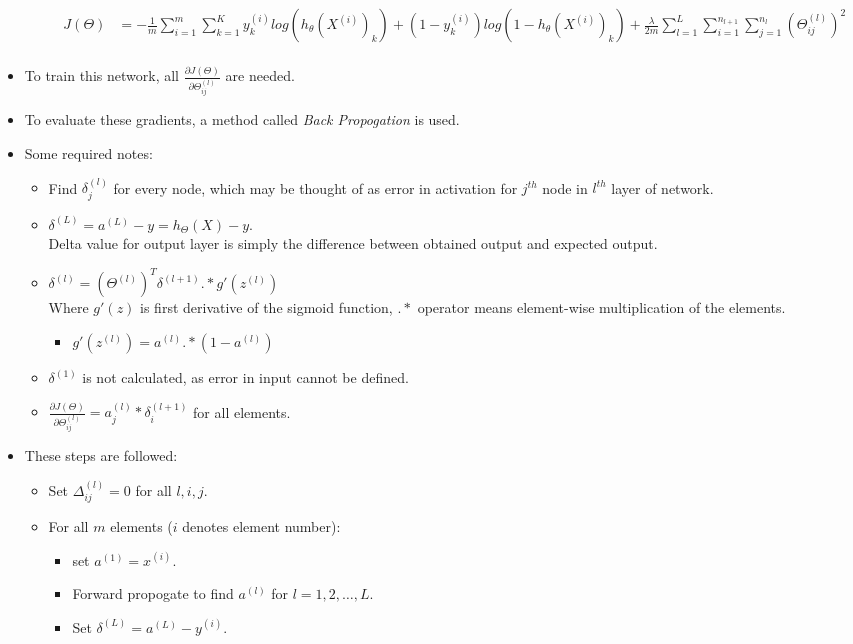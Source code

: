 \documentclass{article}
\begin{document}
\begin{itemize}
\begin{itemize}
		\begin{align*}
			J(\Theta) &= -\frac{1}{m} \sum_{i=1}^m \sum_{k=1}^K y^{(i)}_klog(h_\theta(X^{(i)})_k) + (1-y^{(i)}_k)log(1-h_\theta(X^{(i)})_k) + \frac{\lambda}{2m}\sum_{l=1}^L \sum_{i=1}^{n_{l+1}} \sum_{j=1}^{n_l} (\Theta^{(l)}_{ij})^2\\
		\end{align*}
	\end{itemize}
	\item To train this network, all $\frac{\partial J(\Theta)}{\partial \Theta^{(l)}_{ij}}$ are needed.
	\item To evaluate these gradients, a method called \emph{Back Propogation} is used.
	\item Some required notes:
	\begin{itemize}
		\item Find $\delta^{(l)}_j$ for every node, which may be thought of as error in activation for $j^{th}$ node in $l^{th}$ layer of network.
		\item $\delta^{(L)} = a^{(L)}- y = h_\Theta(X)-y$.\\Delta value for output layer is simply the difference between obtained output and expected output.
		\item $\delta^{(l)} = (\Theta^{(l)})^T \delta^{(l+1)}.*g'(z^{(l)})$\\Where $g'(z)$ is first derivative of the sigmoid function, $.*$ operator means element-wise multiplication of the elements.\begin{itemize}
			\item $g'(z^{(l)}) = a^{(l)}.*(1-a^{(l)})$
		\end{itemize}
		\item $\delta^{(1)}$ is not calculated, as error in input cannot be defined.
		\item $\frac{\partial J(\Theta)}{\partial \Theta^{(l)}_{ij}} = a_j^{(l)}*\delta_i^{(l+1)}$ for all elements.
	\end{itemize}
	\item These steps are followed:\begin{itemize}
		\item Set $\Delta^{(l)}_{ij}=0$ for all $l,i,j$.
		\item For all $m$ elements ($i$ denotes element number): \begin{itemize}
			\item set $a^{(1)}=x^{(i)}$.
			\item Forward propogate to find $a^{(l)}$ for $l=1,2,\dots,L$.
			\item Set $\delta^{(L)} = a^{(L)}- y^{(i)}$.

\end{itemize}
\end{itemize}
\end{itemize}
\end{document}
